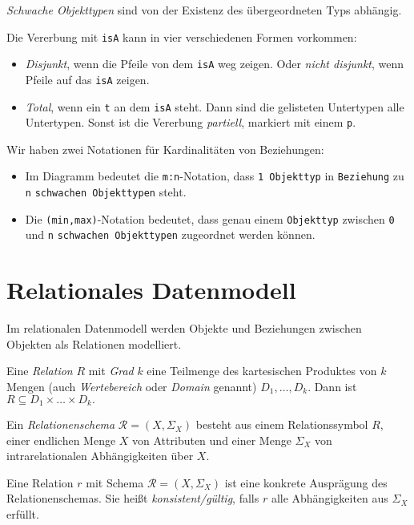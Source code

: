 \documentclass[a4paper,parskip=half*,DIV=15,fontsize=11pt]{scrartcl}
\begin{document}
\emph{Schwache Objekttypen} sind von der Existenz des übergeordneten Typs abhängig.

Die Vererbung mit \lstinline{isA} kann in vier verschiedenen Formen vorkommen:

\begin{itemize}
  \item \emph{Disjunkt}, wenn die Pfeile von dem \lstinline{isA} weg zeigen. Oder \emph{nicht disjunkt}, wenn Pfeile auf das \lstinline{isA} zeigen.
  \item \emph{Total}, wenn ein \lstinline{t} an dem \lstinline{isA} steht. Dann sind die gelisteten Untertypen alle Untertypen. Sonst ist die Vererbung \emph{partiell}, markiert mit einem \lstinline{p}.
\end{itemize}

Wir haben zwei Notationen für Kardinalitäten von Beziehungen:

\begin{itemize}
  \item Im Diagramm bedeutet die \texttt{m:n}-Notation, dass \texttt{1 Objekttyp} in \texttt{Beziehung} zu \texttt{n} \texttt{schwachen Objekttypen} steht.

  \item Die \texttt{(min,max)}-Notation bedeutet, dass genau einem \texttt{Objekttyp} zwischen \texttt{0} und \texttt{n} \texttt{schwachen Objekttypen} zugeordnet werden können.
\end{itemize}

\section{Relationales Datenmodell}
Im relationalen Datenmodell werden Objekte und Beziehungen zwischen Objekten als Relationen modelliert.

Eine \textit{Relation} $R$ mit \textit{Grad} $k$ eine Teilmenge des kartesischen Produktes von $k$ Mengen (auch \textit{Wertebereich} oder \textit{Domain} genannt) $D_1, \ldots, D_k$. Dann ist $R \subseteq D_1 \times \ldots \times D_k.$

Ein \textit{Relationenschema} $\mathcal{R}=(X, \Sigma_X)$ besteht aus einem Relationssymbol $R$, einer endlichen Menge $X$ von Attributen und einer Menge $\Sigma_X$ von intrarelationalen Abhängigkeiten über $X$.

Eine Relation $r$ mit Schema $\mathcal{R}=(X, \Sigma_X)$ ist eine konkrete Ausprägung des Relationenschemas. Sie heißt \textit{konsistent/gültig}, falls $r$ alle Abhängigkeiten aus $\Sigma_X$ erfüllt.
\end{document}
